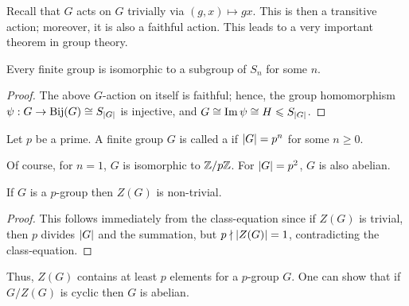 Recall that $G$ acts on $G$ trivially via $(g,x) \mapsto gx$. This is then a transitive action; moreover, it is also a faithful action. This leads to a very important theorem in group theory.

\begin{theorem}
    Every finite group is isomorphic to a subgroup of $S_{n}$ for some $n$.
\end{theorem}

\begin{proof}
    The above $G$-action on itself is faithful; hence, the group homomorphism $\psi:G \to \operatorname{Bij}(G) \cong S_{\left| G \right|}$ is injective, and $G \cong \operatorname{Im} \psi \cong H \leqslant S_{\left| G \right|}$.
\end{proof}

\begin{definition}
    Let $p$ be a prime. A finite group $G$ is called a  if $\left| G \right| = p^{n}$ for some $n \geq 0$.
\end{definition}
Of course, for $n = 1$, $G$ is isomorphic to $\mathbb{Z}/p\mathbb{Z}$. For $\left| G \right| = p^{2}$, $G$ is also abelian.
\begin{proposition}
    If $G$ is a $p$-group then $Z(G)$ is non-trivial.
\end{proposition}
\begin{proof}
    This follows immediately from the class-equation since if $Z(G)$ is trivial, then $p$ divides $\left| G \right|$ and the summation, but $p \nmid \left| Z(G) \right| = 1$, contradicting the class-equation.
\end{proof}
Thus, $Z(G)$ contains at least $p$ elements for a $p$-group $G$. One can show that if $G/Z(G)$ is cyclic then $G$ is abelian.